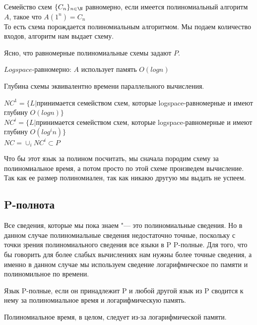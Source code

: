 \begin{Def}
	Семейство схем $\{C_n\}_{n \in \N}$ равномерно, если имеется полиномиальный алгоритм $A$, такое что $A(1^n) = C_n$\\

	То есть схема порождается полиномиальным алгоритмом. Мы подаем количество входов, алгоритм нам выдает схему.
\end{Def}

Ясно, что равномерные полиномиальные схемы задают $P$.
 
\begin{Def}
	$Logspace$-равномерно: $A$ использует память $O(log n)$ \\
\end{Def}

\begin{Def}
	Глубина схемы эквивалентно времени параллельного вычисления. 
\end{Def}

\begin{Def}
	$NC^1 = \{L|$принимается семейством схем, которые logspace-равномерные и имеют глубину $O(log n) \}$
	\\
	$NC^i = \{L|$принимается семейством схем, которые logspace-равномерные и имеют глубину $O(log^i n) \}$
	\\
	$NC = \cup_{i} NC^i \subset P$\\
\end{Def}

Что бы этот язык за полином посчитать, мы сначала породим схему за полиномиальное время, а потом просто 
по этой схеме произведем вычисление. Так как ее размер полиномиален, так как никакю другую мы выдать не успеем. 

\subsection{P-полнота}

Все сведения, которые мы пока знаем "--- это полиномиальные сведения. Но в данном случае 
полиномиальные сведения недостаточно точные, поскольку с точки зрения полиномиального сведения все языки в P P-полные. 
Для того, что бы говорить для более слабых вычислениях нам нужны более точные сведения, а именно
в данном случае мы используем сведение логарифмическое по памяти и полиномильное по времени. 

\begin{Def}
Язык P-полные, если он принадлежит P и любой другой язык из P сводится к нему 
за полиномиальное время и логарифмическую память. 

Полиномиальное время, в целом, следует из-за логарифмической памяти. 
\end{Def}

